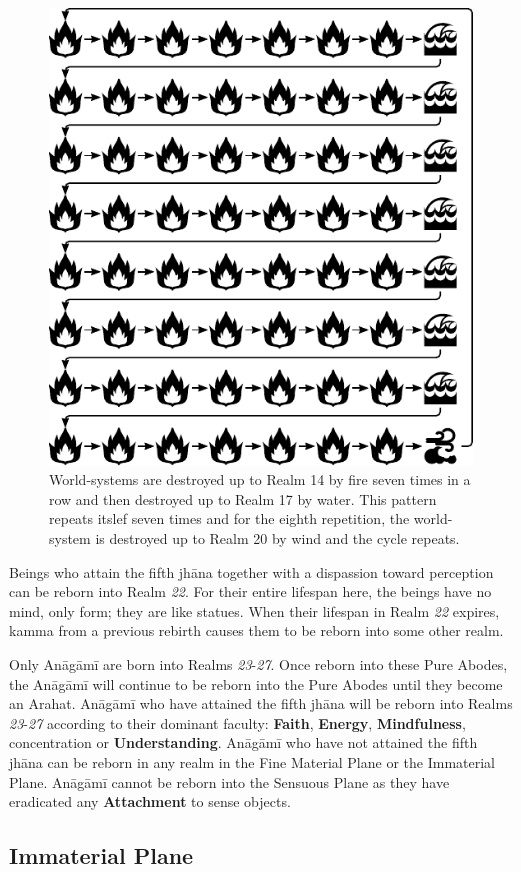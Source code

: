 \begin{figure}[h]
\centering
\includegraphics[width=0.7\linewidth]{./Diagrams/Worlds}
\caption{World-systems are destroyed up to Realm 14 by fire seven times in a row and then destroyed up to Realm 17 by water. This pattern repeats itslef seven times and for the eighth repetition, the world-system is destroyed up to Realm 20 by wind and the cycle repeats.}
\label{fig:Worlds}
\end{figure}

Beings who attain the fifth jhāna together with a dispassion toward perception can be reborn into Realm \textit{22}. For their entire lifespan here, the beings have no mind, only form; they are like statues. When their lifespan in Realm \textit{22} expires, kamma from a previous rebirth causes them to be reborn into some other realm.

Only Anāgāmī are born into Realms \textit{23}-\textit{27}. Once reborn into these Pure Abodes, the Anāgāmī will continue to be reborn into the Pure Abodes until they become an Arahat. Anāgāmī who have attained the fifth jhāna will be reborn into Realms \textit{23}-\textit{27} according to their dominant faculty: \textbf{Faith}, \textbf{Energy}, \textbf{Mindfulness}, concentration or \textbf{Understanding}. Anāgāmī who have not attained the fifth jhāna can be reborn in any realm in the Fine Material Plane or the Immaterial Plane. Anāgāmī cannot be reborn into the Sensuous Plane as they have eradicated any \textbf{Attachment} to sense objects.

\subsection*{Immaterial Plane}

